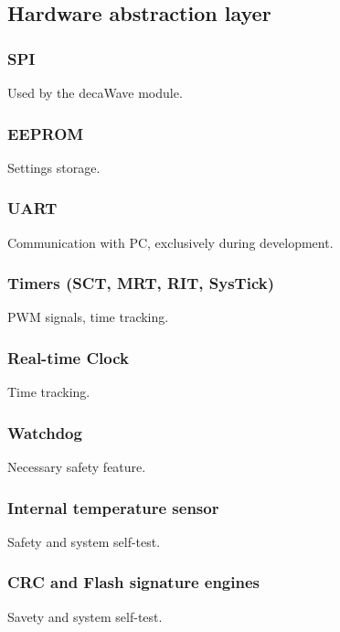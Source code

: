 \subsection{Hardware abstraction layer}



\subsubsection{SPI}
Used by the decaWave module.

\subsubsection{EEPROM}
Settings storage.

\subsubsection{UART}
Communication with PC, exclusively during development.

\subsubsection{Timers (SCT, MRT, RIT, SysTick)}
PWM signals, time tracking.

\subsubsection{Real-time Clock}
Time tracking.

\subsubsection{Watchdog}
Necessary safety feature.

\subsubsection{Internal temperature sensor}
Safety and system self-test.

\subsubsection{CRC and Flash signature engines}
Savety and system self-test.
